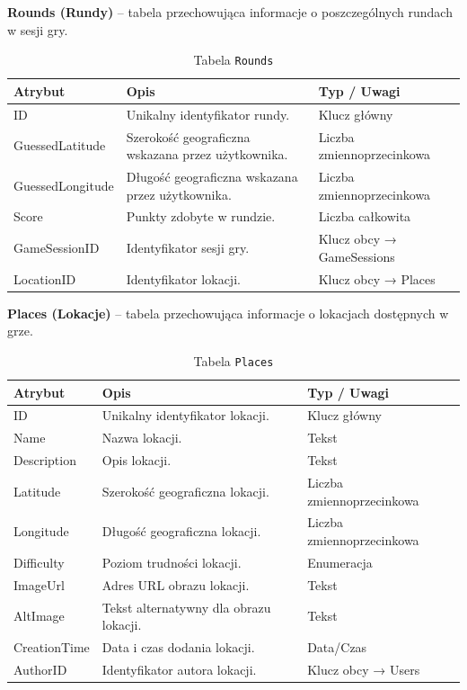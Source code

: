 \textbf{Rounds (Rundy)} – tabela przechowująca informacje o poszczególnych rundach w sesji gry.

\begin{table}[H]
\centering
\renewcommand{\arraystretch}{1.2}
\begin{tabular}{|p{3cm}|p{8.5cm}|p{1.8cm}|}
\hline
\textbf{Atrybut} & \textbf{Opis} & \textbf{Typ / Uwagi} \\ \hline
ID & Unikalny identyfikator rundy. & Klucz główny \\ \hline
GuessedLatitude & Szerokość geograficzna wskazana przez użytkownika. & Liczba zmiennoprzecinkowa \\ \hline
GuessedLongitude & Długość geograficzna wskazana przez użytkownika. & Liczba zmiennoprzecinkowa \\ \hline
Score & Punkty zdobyte w rundzie. & Liczba całkowita \\ \hline
GameSessionID & Identyfikator sesji gry. & Klucz obcy → GameSessions \\ \hline
LocationID & Identyfikator lokacji. & Klucz obcy → Places \\ \hline
\end{tabular}
\caption{Tabela \texttt{Rounds}}
\end{table}

\textbf{Places (Lokacje)} – tabela przechowująca informacje o lokacjach dostępnych w grze.

\begin{table}[H]
\centering
\renewcommand{\arraystretch}{1.2}
\begin{tabular}{|p{2.5cm}|p{8cm}|p{2.5cm}|}
\hline
\textbf{Atrybut} & \textbf{Opis} & \textbf{Typ / Uwagi} \\ \hline
ID & Unikalny identyfikator lokacji. & Klucz główny \\ \hline
Name & Nazwa lokacji. & Tekst \\ \hline
Description & Opis lokacji. & Tekst \\ \hline
Latitude & Szerokość geograficzna lokacji. & Liczba zmiennoprzecinkowa \\ \hline
Longitude & Długość geograficzna lokacji. & Liczba zmiennoprzecinkowa \\ \hline
Difficulty & Poziom trudności lokacji. & Enumeracja \\ \hline
ImageUrl & Adres URL obrazu lokacji. & Tekst \\ \hline
AltImage & Tekst alternatywny dla obrazu lokacji. & Tekst \\ \hline
CreationTime & Data i czas dodania lokacji. & Data/Czas \\ \hline
AuthorID & Identyfikator autora lokacji. & Klucz obcy → Users \\ \hline
\end{tabular}
\caption{Tabela \texttt{Places}}
\end{table}

